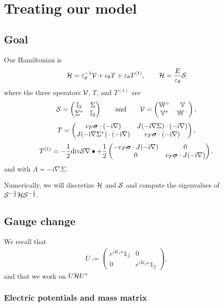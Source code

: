 \documentclass[11pt,a4paper,reqno,french,tikz]{amsart}
\let\p\relax\newcommand{\p}{\psi} %
\newcommand{\na}{\nabla} %
\newcommand{\f}[2]{\frac{#1}{#2}} %
\newcommand{\mat}[1]{\begin{pmatrix} #1 \end{pmatrix}} %
\def\1{{\mathds{1}}}
\newcommand{\bbV}{\mathbb{V}}
\def\bbI{{\mathbb I}}
\def\bbV{{\mathbb V}}
\def\bbW{{\mathbb W}}
\def\1{{\mathds{1}}}
\def\ri{{\rm i}}
\newcommand{\ept}{\varepsilon_\theta}
\def\bsigma{{\boldsymbol\sigma}}
\begin{document}
\section{Treating our model}

\subsection{Goal}%
\label{sub:Goal}

Our Hamiltonian is
\begin{equation} \label{eq:def:Sigma_d}
    \cH = \ept^{-1} \cV + c_\theta T + \ept T^{(1)},\qquad \cH \p = \frac{E}{\ept} \cS \p
\end{equation}
where the three operators $\mathcal{V}$, $T$, and $T^{(1)}$ are
\begin{align*}
\cS =  \mat{
        \bbI_2 & \Sigma \\ \Sigma^* & \bbI_2
} \qquad \mbox{and} \qquad \cV = \mat{
        \bbW^+ & \bbV \\
        \bbV^* & \bbW^-
} ,
\end{align*}
\[
    T = \mat{ v_F \bsigma \cdot ( - \ri \nabla) &  J ( - \ri \nabla \Sigma) \cdot ( - \ri \nabla) \\
         J ( - \ri \nabla \Sigma^*) \cdot ( - \ri \nabla) & v_F \bsigma \cdot ( - \ri \nabla) },
\]
\begin{equation} \label{eq:op_Td1}
    T^{(1)} = - \frac12 {\rm div} \cS \nabla \bullet + \frac12 \mat{
        - v_F \bsigma \cdot J (- \ri \nabla) & 0 \\
        0 & v_F \bsigma \cdot J (- \ri \nabla) }.
\end{equation}
and with $A = -i\na \Sigma$.

Numerically, we will discretize $\mathcal{H}$ and $\mathcal{S}$ and compute the eigenvalues of $\cS^{-\f 12}\cH\cS^{-\f 12}$.

\subsection{Gauge change}%
\label{sub:Gauge change}


We recall that
\begin{align*}
U := \mat{e^{i K_1 x} \1_2 & 0 \\ 0 & e^{iK_2 x} \1_2 },
\end{align*}
and that we work on $U \mathcal{H} U^*$

\subsubsection{Electric potentials and mass matrix}%
\end{document}
